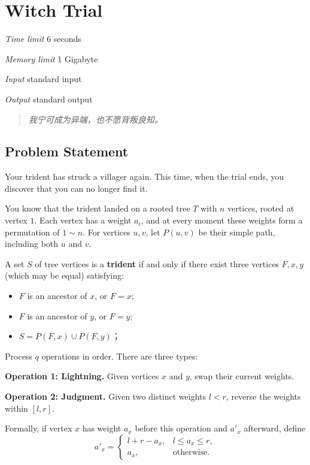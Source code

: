 \section[M. Witch Trial]{ Witch Trial}

\textit{Time limit}   6 seconds

\textit{Memory limit} 1 Gigabyte

\textit{Input} \qquad standard input

\textit{Output} \qquad standard output


\begin{quote}
	\textit{我宁可成为异端，也不愿背叛良知。}
\end{quote}

\subsection{Problem Statement}

Your trident has struck a villager again. This time, when the trial ends, you discover that you can no longer find it.

You know that the trident landed on a rooted tree $T$ with $n$ vertices, rooted at vertex $1$. Each vertex has a weight $a_i$, and at every moment these weights form a permutation of $1 \sim n$. For vertices $u,v$, let $P(u,v)$ be their simple path, including both $u$ and $v$.

A set $S$ of tree vertices is a \textbf{trident} if and only if there exist three vertices $F,x,y$ (which may be equal) satisfying:

\begin{itemize}
	\item $F$ is an ancestor of $x$, or $F=x$;
	\item $F$ is an ancestor of $y$, or $F=y$;
	\item $S = P(F,x)\cup P(F,y)$；
\end{itemize}


Process $q$ operations in order. There are three types:

\textbf{Operation 1: Lightning.} Given vertices $x$ and $y$, swap their current weights.

\textbf{Operation 2: Judgment.} Given two distinct weights $l<r$, reverse the weights within $[l,r]$.

Formally, if vertex $x$ has weight $a_x$ before this operation and $a'_x$ afterward, define
\[
a'_x=
\begin{cases}
l+r-a_x, & l\le a_x\le r,\\
a_x, & \text{otherwise}.
\end{cases}
\]

